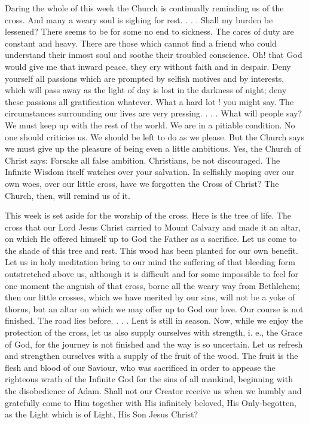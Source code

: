 Daring the whole of this week the Church is 
continually reminding us of the cross. And 
many a weary soul is sighing for rest. . . . 
Shall my burden be lessened? There seems to 
be for some no end to sickness. The cares of 
duty are constant and heavy. There are those 
which cannot find a friend who could understand
their inmost soul and soothe their troubled 
conscience. Oh! that God would give me that 
inward peace, they cry without faith and in despair.
Deny yourself all passions which are 
prompted by selfish motives and by interests, 
which will pass away as the light of day is lost 
in the darkness of night; deny these passions 
all gratification whatever. What a hard lot ! 
you might say. The circumstances surrounding
our lives are very pressing. . . . What will 
people say? We must keep up with the rest of 
the world. We are in a pitiable condition. No
one should criticise us. We should be left to 
do as we please. But the Church says we must 
give up the pleasure of being even a little 
ambitious. Yes, the Church of Christ says: 
Forsake all false ambition. Christians, be not 
discouraged. The Infinite Wisdom itself watches 
over your salvation. In selfishly moping over 
our own woes, over our little cross, have we forgotten
the Cross of Christ? The Church, then, 
will remind us of it. 

This week is set aside for the worship of the 
cross. Here is the tree of life. The cross that 
our Lord Jesus Christ carried to Mount Calvary 
and made it an altar, on which He offered himself
up to God the Father as a sacrifice. Let us 
come to the shade of this tree and rest. This wood 
has been planted for our own benefit. Let us in 
holy meditation bring to our mind the suffering 
of that bleeding form outstretched above us, 
although it is difficult and for some impossible 
to feel for one moment the anguish of that 
cross, borne all the weary way from Bethlehem; 
then our little crosses, which we have merited 
by our sins, will not be a yoke of thorns, but 
an altar on which we may offer up to God our 
love. Our course is not finished. The road lies 
before. . . . Lent is still in season. Now, while 
we enjoy the protection of the cross, let us also
supply ourselves with strength, i. e., the Grace 
of God, for the journey is not finished and 
the way is so uncertain. Let us refresh and 
strengthen ourselves with a supply of the fruit 
of the wood. The fruit is the flesh and blood 
of our Saviour, who was sacrificed in order to 
appease the righteous wrath of the Infinite God 
for the sins of all mankind, beginning with the 
disobedience of Adam. Shall not our Creator 
receive us when we humbly and gratefully come 
to Him together with His infinitely beloved, 
His Only-begotten, as the Light which is of 
Light, His Son Jesus Christ? 

